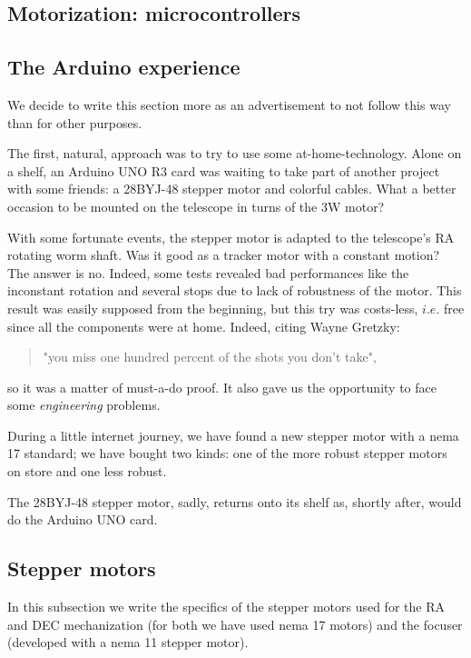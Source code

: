 \documentclass{article}
\begin{document}
\begin{multicols}{2}
         

        \section{Motorization: microcontrollers}
        \subsection{The Arduino experience}
        We decide to write this section more as an advertisement to not follow this way than for other purposes.

        The first, natural, approach was to try to use some at-home-technology.
        Alone on a shelf, an Arduino UNO R3 card was waiting to take part of another project with some friends: a 28BYJ-48 stepper motor and colorful cables.
        What a better occasion to be mounted on the telescope in turns of the 3W motor?

        With some fortunate events, the stepper motor is adapted to the telescope's RA rotating worm shaft.
        Was it good as a tracker motor with a constant motion?
        The answer is no.
        Indeed, some tests revealed bad performances like the inconstant rotation and several stops due to lack of robustness of the motor.
        This result was easily supposed from the beginning, but this try was costs-less, \(i.e.\) free since all the components were at home.
        Indeed, citing Wayne Gretzky:
        \begin{quote}
            "you miss one hundred percent of the shots you don't take",
        \end{quote}
        so it was a matter of must-a-do proof.
        It also gave us the opportunity to face some \textit{engineering} problems.
        
        During a little internet journey, we have found a new stepper motor with a nema 17 standard;
        we have bought two kinds: one of the more robust stepper motors on store and one less robust.
        
        The 28BYJ-48 stepper motor, sadly, returns onto its shelf as, shortly after, would do the Arduino UNO card.

        \subsection{Stepper motors}
        In this subsection we write the specifics of the stepper motors used for the RA and DEC mechanization (for both we have used nema 17 motors) and the focuser (developed with a nema 11 stepper motor).


\end{multicols}
\end{document}
